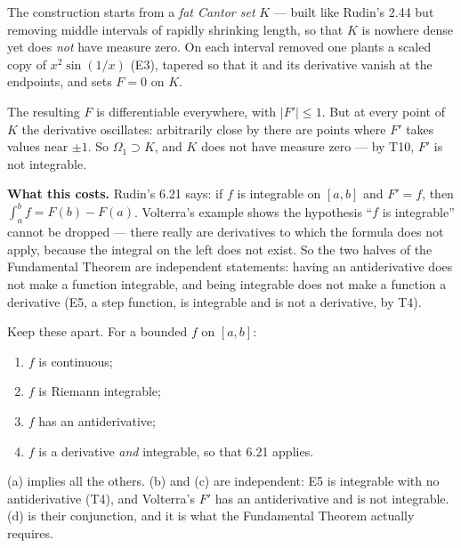 \begin{deeper}
The construction starts from a \emph{fat Cantor set} $K$ --- built like
Rudin's 2.44 but removing middle intervals of rapidly shrinking length, so
that $K$ is nowhere dense yet does \emph{not} have measure zero. On each
interval removed one plants a scaled copy of $x^2\sin(1/x)$ (E3), tapered so
that it and its derivative vanish at the endpoints, and sets $F=0$ on $K$.

The resulting $F$ is differentiable everywhere, with $|F'| \le 1$. But at
every point of $K$ the derivative oscillates: arbitrarily close by there are
points where $F'$ takes values near $\pm1$. So $\Omega_1 \supset K$, and $K$
does not have measure zero --- by T10, $F'$ is not integrable.

\smallskip
\textbf{What this costs.} Rudin's 6.21 says: if $f$ is integrable on $[a,b]$
and $F'=f$, then $\int_a^b f = F(b)-F(a)$. Volterra's example shows the
hypothesis ``$f$ is integrable'' cannot be dropped --- there really are
derivatives to which the formula does not apply, because the integral on the
left does not exist. So the two halves of the Fundamental Theorem are
independent statements: having an antiderivative does not make a function
integrable, and being integrable does not make a function a derivative
(E5, a step function, is integrable and is not a derivative, by T4).
\end{deeper}

\begin{pitfall}
Keep these apart. For a bounded $f$ on $[a,b]$:
\begin{enumerate}[label=(\alph*), leftmargin=2.2em, itemsep=2pt, topsep=3pt]
  \item $f$ is continuous;
  \item $f$ is Riemann integrable;
  \item $f$ has an antiderivative;
  \item $f$ is a derivative \emph{and} integrable, so that 6.21 applies.
\end{enumerate}
(a) implies all the others. (b) and (c) are independent: E5 is integrable
with no antiderivative (T4), and Volterra's $F'$ has an antiderivative and is
not integrable. (d) is their conjunction, and it is what the Fundamental
Theorem actually requires.
\end{pitfall}

